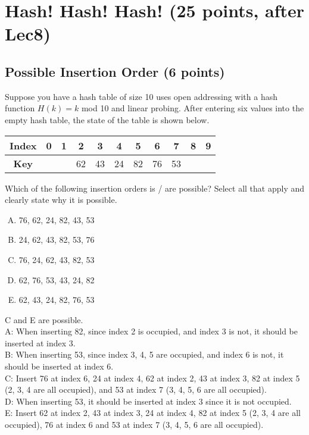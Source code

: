\documentclass[11pt]{exam}
\begin{document}
\section{Hash! Hash! Hash! (25 points, after Lec8)}

\subsection{Possible Insertion Order (6 points)}
Suppose you have a hash table of size 10 uses open addressing with a hash function $H(k) = k$ mod 10 and linear probing. After entering six values into the empty hash table, the state of the table is shown below.

\begin{table}[H]
\centering
\setlength{\tabcolsep}{5.5mm}
\begin{tabular}{|c|c|c|c|c|c|c|c|c|c|c|}
\hline
\textbf{Index}&0&1&2&3&4&5&6&7&8&9\\
\hline
\textbf{Key}&&&62&43&24&82&76&53&&\\
\hline
\end{tabular}
\end{table}
Which of the following insertion orders is / are possible? Select all that apply and clearly state why it is possible.
\begin{enumerate}[A.]
\item 76, 62, 24, 82, 43, 53
\item 24, 62, 43, 82, 53, 76
\item 76, 24, 62, 43, 82, 53
\item 62, 76, 53, 43, 24, 82
\item 62, 43, 24, 82, 76, 53
\end{enumerate}

\begin{solution}
\par
C and E are possible. \\
A: When inserting 82, since index 2 is occupied, and index 3 is not, it should be inserted at index 3. \\
B: When inserting 53, since index 3, 4, 5 are occupied, and index 6 is not, it should be inserted at index 6. \\
C: Insert 76 at index 6, 24 at index 4, 62 at index 2, 43 at index 3, 82 at index 5 (2, 3, 4 are all occupied), and 53 at index 7 (3, 4, 5, 6 are all occupied). \\
D: When inserting 53, it should be inserted at index 3 since it is not occupied. \\
E: Insert 62 at index 2, 43 at index 3, 24 at index 4, 82 at index 5 (2, 3, 4 are all occupied), 76 at index 6 and 53 at index 7 (3, 4, 5, 6 are all occupied).
\end{solution}
\end{document}
